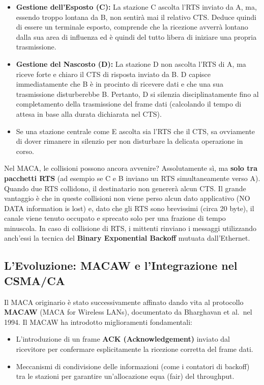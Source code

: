 \documentclass[
  italian,
  openany]{book}
\begin{document}
\begin{itemize}
\item
  \textbf{Gestione dell'Esposto (C):} La stazione C ascolta l'RTS
  inviato da A, ma, essendo troppo lontana da B, non sentirà mai il
  relativo CTS. Deduce quindi di essere un terminale esposto, comprende
  che la ricezione avverrà lontano dalla sua area di influenza ed è
  quindi del tutto libera di iniziare una propria trasmissione.
\item
  \textbf{Gestione del Nascosto (D):} La stazione D non ascolta l'RTS di
  A, ma riceve forte e chiaro il CTS di risposta inviato da B. D capisce
  immediatamente che B è in procinto di ricevere dati e che una sua
  trasmissione disturberebbe B. Pertanto, D si silenzia
  disciplinatamente fino al completamento della trasmissione del frame
  dati (calcolando il tempo di attesa in base alla durata dichiarata nel
  CTS).
\item
  Se una stazione centrale come E ascolta sia l'RTS che il CTS, sa
  ovviamente di dover rimanere in silenzio per non disturbare la
  delicata operazione in corso.
\end{itemize}

Nel MACA, le collisioni possono ancora avvenire? Assolutamente sì, ma
\textbf{solo tra pacchetti RTS} (ad esempio se C e B inviano un RTS
simultaneamente verso A). Quando due RTS collidono, il destinatario non
genererà alcun CTS. Il grande vantaggio è che in queste collisioni non
viene perso alcun dato applicativo (NO DATA information is lost) e, dato
che gli RTS sono brevissimi (circa 20 byte), il canale viene tenuto
occupato e sprecato solo per una frazione di tempo minuscola. In caso di
collisione di RTS, i mittenti rinviano i messaggi utilizzando anch'essi
la tecnica del \textbf{Binary Exponential Backoff} mutuata
dall'Ethernet.

\subsection{L'Evoluzione: MACAW e l'Integrazione nel
CSMA/CA}\label{levoluzione-macaw-e-lintegrazione-nel-csmaca}

Il MACA originario è stato successivamente affinato dando vita al
protocollo \textbf{MACAW} (MACA for Wireless LANs), documentato da
Bharghavan et al.~nel 1994. Il MACAW ha introdotto miglioramenti
fondamentali:

\begin{itemize}
\item
  L'introduzione di un frame \textbf{ACK (Acknowledgement)} inviato dal
  ricevitore per confermare esplicitamente la ricezione corretta del
  frame dati.
\item
  Meccanismi di condivisione delle informazioni (come i contatori di
  backoff) tra le stazioni per garantire un'allocazione equa (fair) del
  throughput.
\end{itemize}
\end{document}
